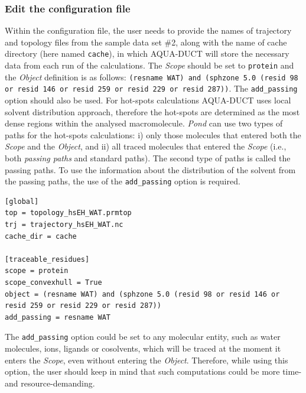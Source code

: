 \documentclass[9pt,tutorial]{livecoms}
\begin{document}
\subsubsection{Edit the configuration file}
Within the configuration file, the user needs to provide the names of trajectory and topology files from the sample data set \#2, along with the name of cache directory (here named \texttt{cache}), in which AQUA-DUCT will store the necessary data from each run of the calculations. The \emph{Scope} should be set to \texttt{protein} and the \emph{Object} definition is as follows: \texttt{(resname WAT) and (sphzone 5.0 (resid 98 or resid 146 or resid 259 or resid 229 or resid 287))}. The \texttt{add\_passing} option should also be used. For hot-spots calculations AQUA-DUCT uses local solvent distribution approach, therefore the hot-spots are determined as the most dense regions within the analysed macromolecule. \textit{Pond} can use two types of paths for the hot-spots calculations: i) only those molecules that entered both the \textit{Scope} and the \textit{Object}, and ii) all traced molecules that entered the \textit{Scope} (i.e., both \textit{passing paths} and standard paths). The second type of paths is called the passing paths. To use the information about the distribution of the solvent from the passing paths, the use of the \texttt{add\_passing} option is required.
\begin{lstlisting}[columns=fullflexible]
[global]
top = topology_hsEH_WAT.prmtop
trj = trajectory_hsEH_WAT.nc
cache_dir = cache

[traceable_residues]
scope = protein
scope_convexhull = True
object = (resname WAT) and (sphzone 5.0 (resid 98 or resid 146 or resid 259 or resid 229 or resid 287))
add_passing = resname WAT
\end{lstlisting}
The \texttt{add\_passing} option could be set to any molecular entity, such as water molecules, ions, ligands or cosolvents, which will be traced at the moment it enters the \emph{Scope}, even without entering the \emph{Object}. Therefore, while using this option, the user should keep in mind that such computations could be more time- and resource-demanding.
\end{document}
